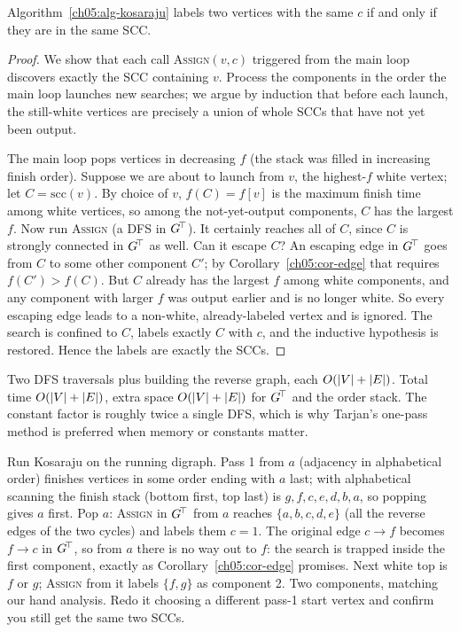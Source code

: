 \begin{theorem}
\label{ch05:thm-kosaraju}
Algorithm~\ref{ch05:alg-kosaraju} labels two vertices with the same $c$ if and only if they are in the same SCC.
\end{theorem}

\begin{proof}
We show that each call \textsc{Assign}$(v,c)$ triggered from the main loop discovers exactly the SCC containing $v$. Process the components in the order the main loop launches new searches; we argue by induction that before each launch, the still-white vertices are precisely a union of whole SCCs that have not yet been output.

The main loop pops vertices in decreasing $f$ (the stack was filled in increasing finish order). Suppose we are about to launch from $v$, the highest-$f$ white vertex; let $C=\mathrm{scc}(v)$. By choice of $v$, $f(C)=f[v]$ is the maximum finish time among white vertices, so among the not-yet-output components, $C$ has the largest $f$. Now run \textsc{Assign} (a DFS in $G^{\!\top}$). It certainly reaches all of $C$, since $C$ is strongly connected in $G^{\!\top}$ as well. Can it escape $C$? An escaping edge in $G^{\!\top}$ goes from $C$ to some other component $C'$; by Corollary~\ref{ch05:cor-edge} that requires $f(C')>f(C)$. But $C$ already has the largest $f$ among white components, and any component with larger $f$ was output earlier and is no longer white. So every escaping edge leads to a non-white, already-labeled vertex and is ignored. The search is confined to $C$, labels exactly $C$ with $c$, and the inductive hypothesis is restored. Hence the labels are exactly the SCCs.
\end{proof}

\begin{complexitybox}
Two DFS traversals plus building the reverse graph, each $O(\lvert V\rvert+\lvert E\rvert)$. Total time $O(\lvert V\rvert+\lvert E\rvert)$, extra space $O(\lvert V\rvert+\lvert E\rvert)$ for $G^{\!\top}$ and the order stack. The constant factor is roughly twice a single DFS, which is why Tarjan's one-pass method is preferred when memory or constants matter.
\end{complexitybox}

\begin{labbox}
Run Kosaraju on the running digraph. Pass 1 from $a$ (adjacency in alphabetical order) finishes vertices in some order ending with $a$ last; with alphabetical scanning the finish stack (bottom first, top last) is $g,f,c,e,d,b,a$, so popping gives $a$ first. Pop $a$: \textsc{Assign} in $G^{\!\top}$ from $a$ reaches $\{a,b,c,d,e\}$ (all the reverse edges of the two cycles) and labels them $c{=}1$. The original edge $c\to f$ becomes $f\to c$ in $G^{\!\top}$, so from $a$ there is no way out to $f$: the search is trapped inside the first component, exactly as Corollary~\ref{ch05:cor-edge} promises. Next white top is $f$ or $g$; \textsc{Assign} from it labels $\{f,g\}$ as component 2. Two components, matching our hand analysis. Redo it choosing a different pass-1 start vertex and confirm you still get the same two SCCs.
\end{labbox}

